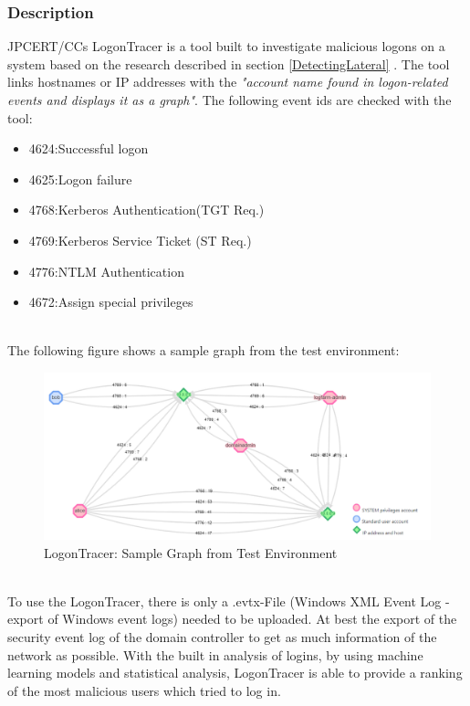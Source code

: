 \subsubsection{Description}
JPCERT/CCs LogonTracer is a tool built to investigate malicious logons on a system based on the research described in section \ref{DetectingLateral} . The tool links hostnames or IP addresses with the \textit{"account name found in logon-related events and displays it as a graph"}. \cite{LogonTracer} The following event ids are checked with the tool: \ \\
\begin{multicols}{2}
    \begin{itemize}
        \item 4624:Successful logon
        \item 4625:Logon failure
        \item 4768:Kerberos Authentication(TGT Req.)
        \item 4769:Kerberos Service Ticket (ST Req.)
        \item 4776:NTLM Authentication
        \item 4672:Assign special privileges
    \end{itemize}
\end{multicols}
\ \\
The following figure shows a sample graph from the test environment:
\begin{figure}[H]
    \centering
    \includegraphics[width=1\linewidth]{assets/LogonTracer/LogonTrace_LogFarm.png}
    \caption{LogonTracer: Sample Graph from Test Environment}
    \label{fig:LogonTracerSample}
\end{figure}
\ \\
To use the LogonTracer, there is only a .evtx-File (Windows XML Event Log - export of Windows event logs) needed to be uploaded. At best the export of the security event log of the domain controller to get as much information of the network as possible. With the built in analysis of logins, by using machine learning models and statistical analysis, LogonTracer is able to provide a ranking of the most malicious users which tried to log in. \cite{LogonTracerBlog}
